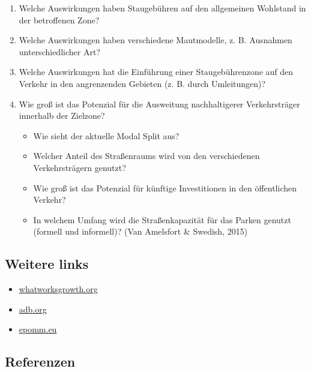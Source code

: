 \documentclass[
]{book}
\providecommand{\tightlist}{%
  \setlength{\itemsep}{0pt}\setlength{\parskip}{0pt}}
\begin{document}
\begin{enumerate}
\def\labelenumi{\arabic{enumi}.}
\tightlist
\item
  Welche Auswirkungen haben Staugebühren auf den allgemeinen Wohlstand in der betroffenen Zone?
\item
  Welche Auswirkungen haben verschiedene Mautmodelle, z. B. Ausnahmen unterschiedlicher Art?
\item
  Welche Auswirkungen hat die Einführung einer Staugebührenzone auf den Verkehr in den angrenzenden Gebieten (z. B. durch Umleitungen)?
\item
  Wie groß ist das Potenzial für die Ausweitung nachhaltigerer Verkehrsträger innerhalb der Zielzone?

  \begin{itemize}
  \tightlist
  \item
    Wie sieht der aktuelle Modal Split aus?
  \item
    Welcher Anteil des Straßenraums wird von den verschiedenen Verkehrsträgern genutzt?
  \item
    Wie groß ist das Potenzial für künftige Investitionen in den öffentlichen Verkehr?
  \item
    In welchem Umfang wird die Straßenkapazität für das Parken genutzt (formell und informell)? (Van Amelsfort \& Swedish, 2015)
  \end{itemize}
\end{enumerate}

\hypertarget{weitere-links-7}{%
\subsection*{Weitere links}\label{weitere-links-7}}

\begin{itemize}
\tightlist
\item
  \href{https://whatworksgrowth.org/policy-reviews/transport/congestion-charging}{whatworksgrowth.org}
\item
  \href{https://www.adb.org/sites/default/files/publication/159940/introduction-congestion-charging.pdf}{adb.org}
\item
  \href{http://www.epomm.eu/newsletter/v2/content/2015/0415/doc/eupdate_en.pdf}{epomm.eu}
\end{itemize}

\hypertarget{referenzen-9}{%
\subsection*{Referenzen}\label{referenzen-9}}
\end{document}
